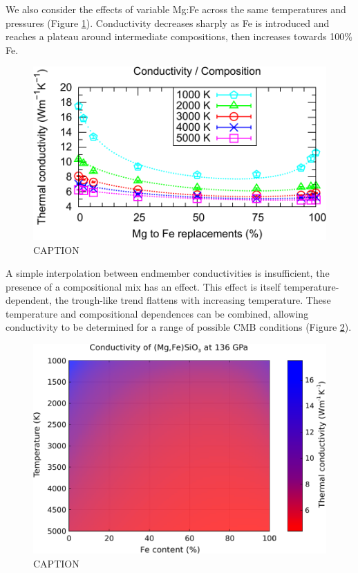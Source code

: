 We also consider the effects of variable Mg:Fe across the same temperatures and pressures (Figure \ref{fig:kappa-comp_01}). Conductivity decreases sharply as Fe is introduced and reaches a plateau around intermediate compositions, then increases towards 100\% Fe. 

\begin{figure}[h!]
  \includegraphics[width=\linewidth]{Figures/k-c_all_01.png}
  \caption{CAPTION}
  \label{fig:kappa-comp_01}
\end{figure}

A simple interpolation between endmember conductivities is insufficient, the presence of a compositional mix has an effect. This effect is itself temperature-dependent, the trough-like trend flattens with increasing temperature. These temperature and compositional dependences can be combined, allowing conductivity to be determined for a range of possible CMB conditions (Figure \ref{fig:kappa-temp-comp_01}). 

\begin{figure}[h!]
  \includegraphics[width=\linewidth]{Figures/K_over_T_over_X.png}
  \caption{CAPTION}
  \label{fig:kappa-temp-comp_01}
\end{figure}












\pagebreak